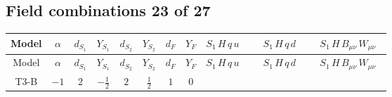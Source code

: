 \documentclass[8pt]{article}
\begin{document}
\begin{landscape}
\subsection*{Field combinations 23 of 27}
\begin{longtable}{@{}cccccccc >{\raggedright\arraybackslash}p{0.21\linewidth} >{\raggedright\arraybackslash}p{0.21\linewidth} >{\raggedright\arraybackslash}p{0.21\linewidth}@{}}
\toprule
Model & $\alpha$ & $d_{S_1}$ & $Y_{S_1}$ & $d_{S_2}$ & $Y_{S_2}$ & $d_F$ & $Y_F$ & $S_1\,H\,q\,u$ & $S_1\,H\,q\,d$ & $S_1\,H\,B_{\mu\nu}\,W_{\mu\nu}$ \\
\midrule
\endfirsthead
\toprule
Model & $\alpha$ & $d_{S_1}$ & $Y_{S_1}$ & $d_{S_2}$ & $Y_{S_2}$ & $d_F$ & $Y_F$ & $S_1\,H\,q\,u$ & $S_1\,H\,q\,d$ & $S_1\,H\,B_{\mu\nu}\,W_{\mu\nu}$ \\
\midrule
\endhead
T3-B & $-1$ & $2$ & $-\frac{1}{2}$ & $2$ & $\frac{1}{2}$ & $1$ & $0$ & \scriptsize\adjustbox{max width=\linewidth}{$\begin{gathered} +\frac{\hbar  \overline{Y_{u,i_1,i_2}} \overline{u_{\alpha _1,i_2}}\, P_L\, q_{\alpha _1,a_2,i_1} H_{a_1} H_{a_3} \epsilon_{a_2,a_3} H_{a_1}{}^{\dagger } \left(\lambda_{HS_1}^{(1)}^{(1)}\right){}^2}{12 m_1^2} \\ +\frac{\hbar  \overline{q_{\alpha _1,a_3,i_2}}\, P_R\, u_{\alpha _1,i_1} H_{a_2} Y_{u,i_2,i_1} \epsilon_{a_3,a_1} H_{a_1}{}^{\dagger } H_{a_2}{}^{\dagger } \left(\lambda_{HS_1}^{(1)}^{(1)}\right){}^2}{12 m_1^2} \\ +\frac{5 \hbar  \overline{Y_{u,i_1,i_2}} \overline{u_{\alpha _1,i_2}}\, P_L\, q_{\alpha _1,a_2,i_1} H_{a_1} H_{a_3} \epsilon_{a_2,a_3} H_{a_1}{}^{\dagger } \left(\lambda_{HS_1}^{(1)}^{(2)}\right){}^2}{36 m_1^2}\end{gathered}$} & \scriptsize\adjustbox{max width=\linewidth}{$\begin{gathered} +\frac{\hbar  \overline{q_{\alpha _1,a_2,i_2}}\, P_R\, d_{\alpha _1,i_1} H_{a_1} H_{a_2} Y_{d,i_2,i_1} H_{a_1}{}^{\dagger } \left(\lambda_{HS_1}^{(1)}^{(1)}\right){}^2}{12 m_1^2} \\ +\frac{\hbar  \overline{Y_{d,i_1,i_2}} \overline{d_{\alpha _1,i_2}}\, P_L\, q_{\alpha _1,a_1,i_1} H_{a_2} H_{a_1}{}^{\dagger } H_{a_2}{}^{\dagger } \left(\lambda_{HS_1}^{(1)}^{(1)}\right){}^2}{12 m_1^2} \\ +\frac{5 \hbar  \overline{q_{\alpha _1,a_2,i_2}}\, P_R\, d_{\alpha _1,i_1} H_{a_1} H_{a_2} Y_{d,i_2,i_1} H_{a_1}{}^{\dagger } \left(\lambda_{HS_1}^{(1)}^{(2)}\right){}^2}{36 m_1^2}\end{gathered}$} & \scriptsize\adjustbox{max width=\linewidth}{$\begin{gathered} +\frac{\hbar  B_{\mu _1\mu _2} H_{a_2} \text{gen}(\text{SU2L}(\text{fund}))_{A_1,a_1,a_2} W_{\mu _1\mu _2}^{A_1} H_{a_1}{}^{\dagger } \lambda_{HS_1}^{(1)}^{(1)}}{12 m_1^2} \\ -\frac{\hbar  B_{\mu _1\mu _2} H_{a_2} \text{gen}(\text{SU2L}(\text{fund}))_{A_1,a_1,a_2} W_{\mu _1\mu _2}^{A_1} H_{a_1}{}^{\dagger } \lambda_{HS_1}^{(1)}^{(2)}}{12 \sqrt{3} m_1^2}\end{gathered}$} \\

\end{longtable}
\end{landscape}
\end{document}
